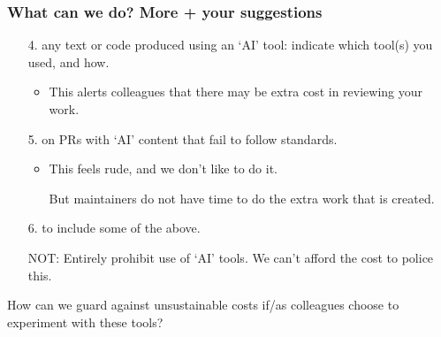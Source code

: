 \documentclass[12pt,aspectratio=169]{beamer}
\begin{document}
\begin{frame}
\frametitle{What can we do? More + your suggestions}

\begin{enumerate}
  \item [4.]  any text or code produced using an ‘AI’ tool:
  indicate which tool(s) you used, and how.
    \begin{itemize}
      \item This alerts colleagues that there may be extra cost in reviewing your work.
    \end{itemize}
  \item [5.]  on PRs with ‘AI’ content that fail to follow standards.
    \begin{itemize}
      \item This feels rude, and we don't like to do it.

        But maintainers do not have time to do the extra work that is created.
    \end{itemize}
  \item [6.]  to include some of the above.
  \item [NOT:] Entirely prohibit use of ‘AI’ tools.
    We can't afford the cost to police this.
\end{enumerate}

\bigskip
{}

\medskip
How can we  guard against unsustainable costs if/as colleagues choose to experiment with these tools?
\end{frame}

\makefinalslide
\end{document}
